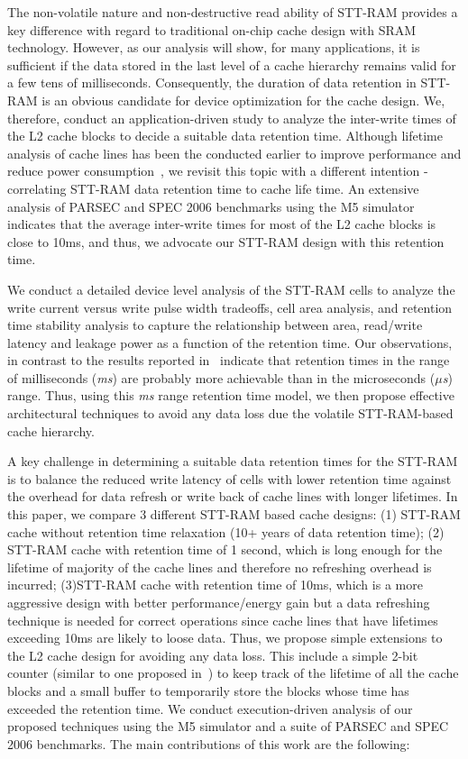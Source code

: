 The non-volatile nature and non-destructive read ability of STT-RAM provides a key difference with
regard to traditional on-chip cache design with SRAM technology. However, as our analysis will show,
for many applications, it is sufficient if the data stored in the last level of a cache hierarchy
remains valid for a few tens of milliseconds. Consequently, the duration of data retention in STT-RAM
is an obvious candidate for device optimization for the cache design. We, therefore, conduct an
application-driven study to analyze the inter-write times of the L2 cache blocks to decide a suitable
data retention time. Although lifetime analysis of cache lines has been the conducted earlier to
improve performance and reduce power consumption~\cite{cache-decay-2001,3t1d-cache}, we revisit this
topic with a different intention - correlating STT-RAM data retention time to cache life time. An
extensive analysis of PARSEC and SPEC 2006 benchmarks using the M5 simulator~\cite{M5} indicates that
the average inter-write times for most of the L2 cache blocks is close to 10ms, and thus, we advocate
our STT-RAM design with this retention time.

We conduct a detailed device level analysis of the STT-RAM cells to analyze the write current versus
write pulse width tradeoffs, cell area analysis, and retention time stability analysis to capture the
relationship between area, read/write latency and leakage power as a function of the retention time.
Our observations, in contrast to the results reported in~\cite{STTRAM:HPCA11} indicate that retention
times in the range of milliseconds ({\it ms}) are probably more achievable than in the microseconds
({\it $\mu$s}) range. Thus, using this {\it ms} range retention time model, we then propose effective
architectural techniques to avoid any data loss due the volatile STT-RAM-based cache hierarchy.

A key challenge in determining a suitable data retention times for the STT-RAM is to balance the
reduced write latency of cells with lower retention time against the overhead for data refresh or
write back of cache lines with longer lifetimes. In this paper, we compare 3 different STT-RAM based
cache designs: (1) STT-RAM cache without retention time relaxation (10+ years of data retention
time); (2) STT-RAM cache with retention time of 1 second, which is long enough for the lifetime of
majority of the cache lines and therefore no refreshing overhead is incurred; (3)STT-RAM cache with
retention time of 10ms, which is a more aggressive design with better performance/energy gain but a
data refreshing technique is needed for correct operations since cache lines that have lifetimes
exceeding 10ms are likely to loose data. Thus, we propose simple extensions to the L2 cache design
for avoiding any data loss. This include a simple 2-bit counter (similar to one proposed
in~\cite{cache-decay-2001}) to keep track of the lifetime of all the cache blocks and a small buffer
to temporarily store the blocks whose time has exceeded the retention time. We conduct
execution-driven analysis of our proposed techniques using the M5 simulator and a suite of PARSEC and
SPEC 2006 benchmarks. The main contributions of this work are the following:

